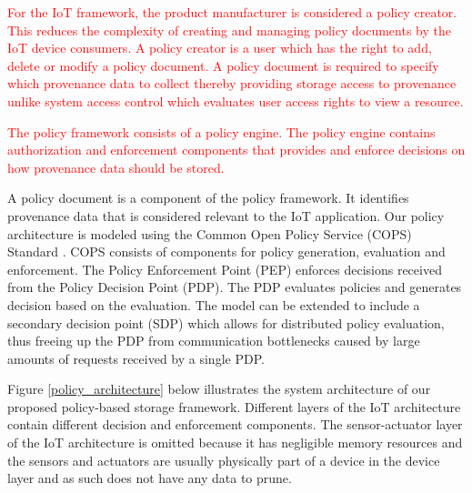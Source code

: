 \textcolor{red}{ For the IoT framework, the product manufacturer is considered a policy creator. This reduces the complexity of creating and managing policy documents by the IoT device consumers. A policy creator is a user which has the right to add, delete or modify a policy document. A policy document is required to specify which provenance data to collect thereby providing storage access to provenance unlike system access control which evaluates user access rights to view a resource. }





\par 

\textcolor{red}{The policy framework consists of a policy engine. The policy engine contains authorization and enforcement components that provides and enforce decisions on how provenance data should be stored. }

A policy document is a component of the policy framework. It identifies provenance data that is considered relevant to the IoT application. Our policy architecture is modeled using the Common Open Policy Service (COPS) Standard \cite{rfc2748}. COPS consists of components for policy generation, evaluation and enforcement. The Policy Enforcement Point (PEP) enforces decisions received from the Policy Decision Point (PDP). The PDP evaluates policies and generates decision based on the evaluation. The model can be extended to include a secondary decision point (SDP) which allows for distributed policy evaluation, thus freeing up the PDP from communication bottlenecks caused by large amounts of requests received by a single PDP.  

\par Figure \ref{policy_architecture} below illustrates the system architecture of our proposed policy-based storage framework. Different layers of the IoT architecture contain different decision and enforcement components. The sensor-actuator layer of the IoT architecture is omitted because it has negligible memory resources and the  sensors and actuators are usually physically part of a device in the device layer and as such does not have any data to prune. 

